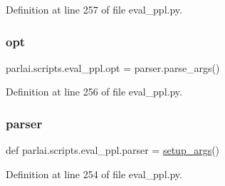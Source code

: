 Definition at line 257 of file eval\+\_\+ppl.\+py.

\mbox{\label{namespaceparlai_1_1scripts_1_1eval__ppl_a0e79f76660ddfdf2c00a552f50edaec6}} 
\subsubsection{\texorpdfstring{opt}{opt}}
{\footnotesize\ttfamily parlai.\+scripts.\+eval\+\_\+ppl.\+opt = parser.\+parse\+\_\+args()}



Definition at line 256 of file eval\+\_\+ppl.\+py.

\mbox{\label{namespaceparlai_1_1scripts_1_1eval__ppl_a01904cd2f6723523a01b996b43aa9fea}} 
\subsubsection{\texorpdfstring{parser}{parser}}
{\footnotesize\ttfamily def parlai.\+scripts.\+eval\+\_\+ppl.\+parser = \hyperlink{namespaceparlai_1_1scripts_1_1eval__ppl_a4ae22cc04e19c46ed621afeba6e85d67}{setup\+\_\+args}()}



Definition at line 254 of file eval\+\_\+ppl.\+py.

